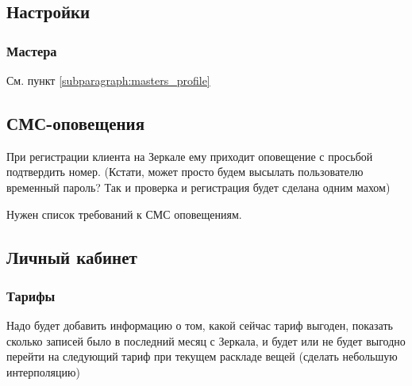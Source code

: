 \documentclass[DIV=calc, paper=a4, fontsize=11pt]{scrartcl} %
\begin{document}
\subsection{Настройки}
\subsubsection{Мастера}
См. пункт \ref{subparagraph:masters_profile}

\subsection{СМС-оповещения}
При регистрации клиента на Зеркале ему приходит оповещение с просьбой подтвердить номер. (Кстати, может просто будем высылать пользователю временный пароль? Так и проверка и регистрация будет сделана одним махом)

Нужен список требований к СМС оповещениям.

\subsection{Личный кабинет}
\subsubsection{Тарифы}
Надо будет добавить информацию о том, какой сейчас тариф выгоден, показать сколько записей было в последний месяц с Зеркала, и будет или не будет выгодно перейти на следующий тариф при текущем раскладе вещей (сделать небольшую интерполяцию)
\end{document}

